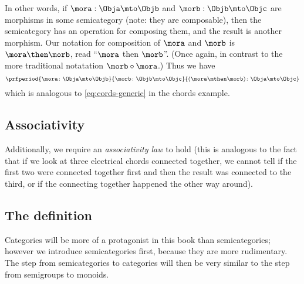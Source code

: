 In other words, if $\mora: \Obja \mto \Objb$ and $\morb: \Objb \mto \Objc$ are morphisms in some semicategory (note: they are composable), then the semicategory has an operation for composing them, and the result is another morphism.
Our notation for composition of $\mora$ and $\morb$ is $\mora \then \morb$, read ``$\mora$ then $\morb$''.
(Once again, in contrast to the more traditional notatation $\morb \circ \mora$.) Thus we have
\begin{equation}
    \prfperiod{
        \mora \colon \Obja \mto \Objb
    }{
        \morb\colon \Objb \mto \Objc
    }{
        (\mora \mthen \morb )\colon \Obja \mto \Objc
    }
\end{equation}
which is analogous to \cref{eq:cords-generic}  in the chords example.


\subsection{Associativity}


Additionally, we require an \emph{associativity law} to hold (this is analogous to the fact that if we look at three electrical chords connected together, we cannot tell if the first two were connected together first and then the result was connected to the third, or if the connecting together happened the other way around).

\subsection{The definition}

Categories will be more of a protagonist in this book than semicategories; however we introduce semicategories first, because they are more rudimentary.
The step from semicategories to categories will then be very similar to the step from semigroups to monoids.

